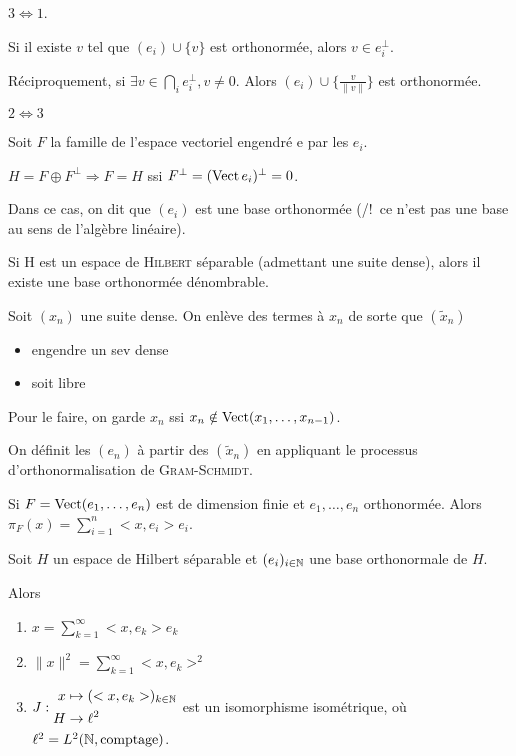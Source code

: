 \documentclass[10pt,a4paper,notitlepage ]{report}
\begin{document}
\begin{demo}
	$3\Leftrightarrow 1$.
	
	Si il existe $v$ tel que $(e_i)\cup\{v\}$ est orthonormée, alors $v\in e_i^\perp$.
	
	Réciproquement, si $\exists v \in \bigcap_i e_i^\perp, v\neq 0$. Alors $(e_i)\cup \{\frac v {\|v\|}\}$ est orthonormée.
	
	$2 \Leftrightarrow 3$
	
	Soit $F$ la famille de l'espace vectoriel engendré e par les $e_i$.
	
	$H = F \oplus F^\perp \Rightarrow F=H$ ssi $F^\perp = (\operatorname{Vect} e_i)^\perp = 0$.
\end{demo}

Dans ce cas, on dit que $(e_i)$ est une base orthonormée (/!\ ce n'est pas une base au sens de l'algèbre linéaire).

\begin{theorem}
	Si H est un espace de \textsc{Hilbert} séparable (admettant une suite dense), alors il existe une base orthonormée dénombrable.
\end{theorem}

\begin{demo}
	Soit $(x_n)$ une suite dense. On enlève des termes à $x_n$ de sorte que $(\tilde x_n)$
	\begin{itemize}
		\item engendre un sev dense
		\item soit libre
	\end{itemize}
	Pour le faire, on garde $x_n$ ssi $x_n \notin \operatorname{Vect}(x_1,\dots,x_{n-1})$.
	
	On définit les $(e_n)$ à partir des $(\tilde x_n)$ en appliquant le processus d'orthonormalisation de \textsc{Gram-Schmidt}.
\end{demo}


\begin{lemme}
	Si $F=\operatorname{Vect}(e_1,\dots,e_n)$ est de dimension finie et $e_1,\dots,e_n$ orthonormée. Alors $\pi_F(x) = \sum_{i=1}^n <x,e_i>e_i$.
\end{lemme}

\begin{theorem}
	Soit $H$ un espace de Hilbert séparable et $(e_i)_{i\in\mathbb N}$ une base orthonormale de $H$.
	
	Alors \begin{enumerate}
		\item $x=\sum_{k=1}^\infty <x,e_k>e_k$
		\item $\|x\|^2 = \sum_{k=1}^\infty <x,e_k>^2$
		\item $J:\begin{aligned} x&\mapsto (<x,e_k>)_{k\in\mathbb N} \\ H &\rightarrow \ell^2 \end{aligned}$ est un isomorphisme isométrique, où $\ell^2 = L^2(\mathbb N,\text{comptage})$.
	\end{enumerate}
\end{theorem}
\end{document}
